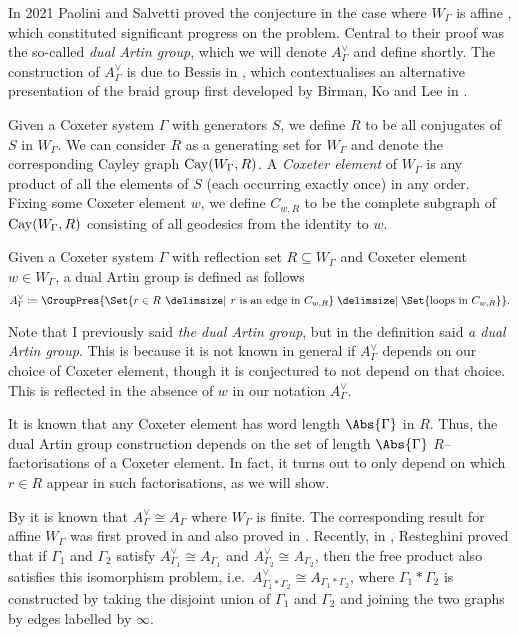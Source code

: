 In 2021 Paolini and Salvetti proved the conjecture in the case where $W_\Gamma$ is affine \cite{paolini_salvetti_kpi1_2021}, which constituted significant progress on the problem.
Central to their proof was the so-called \emph{dual Artin group}, which we will denote $A^\vee_\Gamma$ and define shortly.
The construction of $A^\vee_\Gamma$ is due to Bessis in \cite{bessis_dual_2003}, which contextualises an alternative presentation of the braid group first developed by Birman, Ko and Lee in \cite{birman_etal_new_1998}.

Given a Coxeter system $\Gamma$ with generators $S$, we define $R$ to be all conjugates of  $S$ in  $W_\Gamma$.
We can consider $R$ as a generating set for $W_\Gamma$ and denote the corresponding Cayley graph  $\operatorname{Cay}(W_\Gamma,R)$.
A \emph{Coxeter element} of  $W_\Gamma$ is any product of all the elements of $S$ (each occurring exactly once) in any order.
Fixing some Coxeter element $w$, we define $C_{w,R}$ to be the complete subgraph of $\operatorname{Cay}(W_\Gamma,R)$ consisting of all geodesics from the identity to $w$.

\begin{definition}
	\label{def:dual_artin}
	Given a Coxeter system $\Gamma$ with reflection set  $R \subseteq W_\Gamma$ and Coxeter element $w \in W_\Gamma$, a dual Artin group is defined as follows
	\[
		A^\vee_\Gamma \coloneq \GroupPres{\Set{r \in R \given r \text{ is an edge in } C_{w,R}} \relations \Set{ \text{loops in } C_{w,R}}}
		.\]
\end{definition}

Note that I previously said \emph{the dual Artin group}, but in the definition said \emph{a dual Artin group}.
This is because it is not known in general if $A^\vee_\Gamma$ depends on our choice of Coxeter element, though it is conjectured to not depend on that choice.
This is reflected in the absence of $w$ in our notation  $A^\vee_\Gamma$.

It is known that any Coxeter element has word length $\Abs{\Gamma}$ in $R$.
Thus, the dual Artin group construction depends on the set of length $\Abs{\Gamma}$ $R$--factorisations of  a Coxeter element.
In fact, it turns out to only depend on which $r \in R$ appear in such factorisations, as we will show.

By \cite{bessis_dual_2003, brady_watt_kp_2002} it is known that $A^\vee_\Gamma \cong A_\Gamma$ where  $W_\Gamma$ is finite.
The corresponding result for affine $W_\Gamma$ was first proved in \cite{mccammond_sulway_artin_2017} and also proved in \cite{paolini_salvetti_kpi1_2021}.
Recently, in \cite{resteghini_free_2024}, Resteghini proved that if $\Gamma_1$ and  $\Gamma_2$ satisfy $A^\vee_{\Gamma_1} \cong A_{\Gamma_1}$ and $A^\vee_{\Gamma_2}\cong A_{\Gamma_2}$, then the free product also satisfies this isomorphism problem, i.e.~$A^\vee_{\Gamma_1 \ast \Gamma_2} \cong A_{\Gamma_1\ast \Gamma_2}$, where $\Gamma_1 \ast \Gamma_2$ is constructed by taking the disjoint union of $\Gamma_1$ and  $\Gamma_2$ and joining the two graphs by edges labelled by $\infty$.

